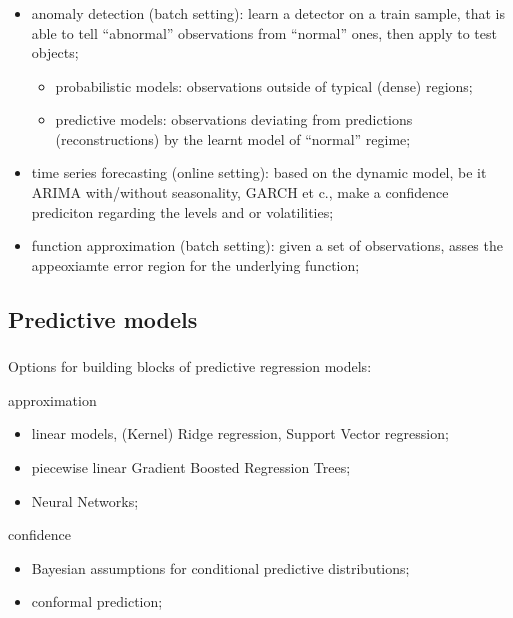 \documentclass[t]{beamer}  %
\begin{document}
\begin{frame}[c]\frametitle{\insertsection}
  \framesubtitle{\insertsubsection}
  \begin{itemize}
    \item anomaly detection (batch setting): learn a detector on a train sample,
    that is able to tell ``abnormal'' observations from ``normal'' ones, then
    apply to test objects;
    \begin{itemize}
      \item probabilistic models: observations outside of typical (dense) regions;
      \item predictive models: observations deviating from predictions (reconstructions)
      by the learnt model of ``normal'' regime;
    \end{itemize}
    \item time series forecasting (online setting): based on the dynamic model, be
    it ARIMA with/without seasonality, GARCH et c., make a confidence prediciton
    regarding the levels and or volatilities;
    \item function approximation (batch setting): given a set of observations,
    asses the appeoxiamte error region for the underlying function;
  \end{itemize}
\end{frame}

\subsection{Predictive models} %
\label{sub:predictive_models}

\begin{frame}[c]\frametitle{\insertsection}
  \framesubtitle{\insertsubsection}
  Options for building blocks of predictive regression models: 
  \begin{block}{approximation}
    \begin{itemize}
      \item linear models, (Kernel) Ridge regression, Support Vector regression;
      \item piecewise linear Gradient Boosted Regression Trees;
      \item Neural Networks;
    \end{itemize}
  \end{block}
  \begin{block}{confidence}
      \begin{itemize}
        \item Bayesian assumptions for conditional predictive distributions;
        \item conformal prediction;
      \end{itemize}
  \end{block}
\end{frame}
\end{document}
